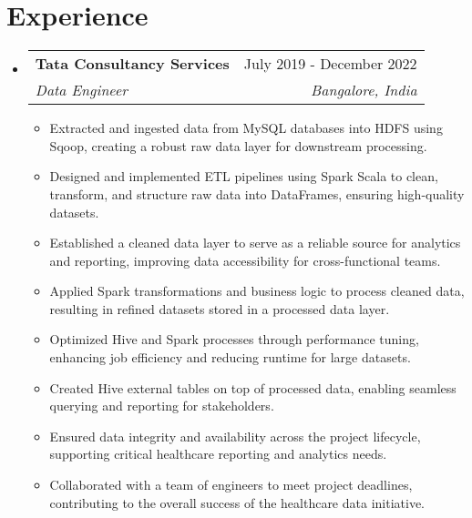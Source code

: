 \documentclass[letterpaper,11pt]{article}
\makeatletter
\newcommand{\resumeItem}[1]{
  \item\small{
    {#1 \vspace{-2pt}}
  }
}
\newcommand{\resumeSubheading}[4]{
  \vspace{-2pt}\item
    \begin{tabular*}{0.97\textwidth}[t]{l@{\extracolsep{\fill}}r}
      \textbf{#1} & #2 \\
      \textit{\small#3} & \textit{\small #4} \\
    \end{tabular*}\vspace{-7pt}
}
\newcommand{\resumeSubSubheading}[2]{
    \item
    \begin{tabular*}{0.97\textwidth}{l@{\extracolsep{\fill}}r}
      \textit{\small#1} & \textit{\small #2} \\
    \end{tabular*}\vspace{-7pt}
}
\newcommand{\resumeSubHeadingListStart}{\begin{itemize}[leftmargin=0.15in, label={}]}
\newcommand{\resumeSubHeadingListEnd}{\end{itemize}}
\newcommand{\resumeItemListStart}{\begin{itemize}}
\newcommand{\resumeItemListEnd}{\end{itemize}\vspace{-5pt}}
\makeatother
\begin{document}



\section{Experience}
  \resumeSubHeadingListStart

   
      

    \resumeSubheading
      {Tata Consultancy Services}{July 2019 - December 2022}
      {Data Engineer}{Bangalore, India}
      \resumeItemListStart
      \resumeItem{Extracted and ingested data from MySQL databases into HDFS using Sqoop, creating a robust raw data layer for downstream processing.}
      \resumeItem{Designed and implemented ETL pipelines using Spark Scala to clean, transform, and structure raw data into DataFrames, ensuring high-quality datasets.}
        \resumeItem {Established a cleaned data layer to serve as a reliable source for analytics and reporting, improving data accessibility for cross-functional teams.}
        \resumeItem {Applied Spark transformations and business logic to process cleaned data, resulting in refined datasets stored in a processed data layer.}
        \resumeItem {Optimized Hive and Spark processes through performance tuning, enhancing job efficiency and reducing runtime for large datasets.}
\resumeItem {Created Hive external tables on top of processed data, enabling seamless querying and reporting for stakeholders.}
\resumeItem {Ensured data integrity and availability across the project lifecycle, supporting critical healthcare reporting and analytics needs.}
\resumeItem {Collaborated with a team of engineers to meet project deadlines, contributing to the overall success of the healthcare data initiative.}
    \resumeItemListEnd
      

  \resumeSubHeadingListEnd
\end{document}
